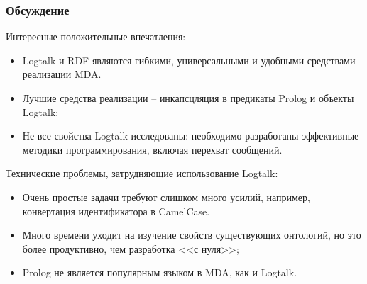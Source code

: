 \documentclass[10pt]{beamer}
\begin{document}
\begin{frame}
  \frametitle{Обсуждение}
Интересные положительные впечатления:
\begin{itemize}
\item Logtalk и RDF являются гибкими, универсальными и удобными средствами реализации MDA.
\item Лучшие средства реализации -- инкапсцляция в предикаты Prolog и объекты Logtalk;
\item Не все свойства Logtalk исследованы: необходимо разработаны эффективные методики программирования, включая перехват сообщений.
\end{itemize}
Технические проблемы, затрудняющие использование Logtalk:
\begin{itemize}
\item Очень простые задачи требуют слишком много усилий, например, конвертация идентификатора в CamelCase.
\item Много времени уходит на изучение свойств существующих онтологий, но это более продуктивно, чем разработка <<с нуля>>;
\item Prolog не является популярным языком в MDA, как и Logtalk.
\end{itemize}
\end{frame}

\end{document}
